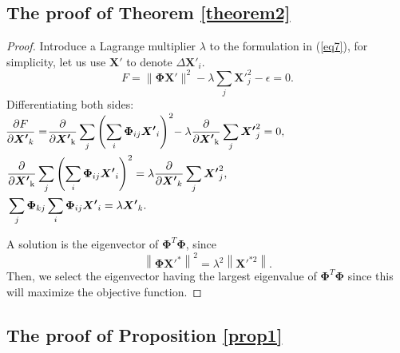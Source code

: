 \documentclass[conference,compsoc]{IEEEtran}
\begin{document}
\subsection{The proof of Theorem \ref{theorem2}}
\begin{proof}
\par Introduce a Lagrange multiplier $\lambda$ to the formulation in (\ref{eq7}), for simplicity, let us use $\boldsymbol{X'}$ to denote $\Delta \boldsymbol{X'}_i$.
\begin{equation*}
F=\|\boldsymbol{\Phi} \boldsymbol{X'}\|^2-\lambda \sum_j \boldsymbol{X'}_j^2-\epsilon=0. 
\end{equation*}
\noindent Differentiating both sides:\\
$
\begin{aligned}
&\mspace{-2mu} \frac{\partial F}{\partial \boldsymbol{X'}_k} = \mspace{-4mu} \frac{\partial}{\partial \boldsymbol{X'}_{\mathrm{k}}} \sum_j\left(\sum_i \boldsymbol{\Phi}_{i j} \boldsymbol{X'}_i\right)^2\mspace{-4mu} -\lambda \frac{\partial}{\partial \boldsymbol{X'}_{\mathrm{k}}} \sum_j \boldsymbol{X'}_j^2 = 0,
\\
&\frac{\partial}{\partial \boldsymbol{X'}_{\mathrm{k}}} \sum_j\left(\sum_i \boldsymbol{\Phi}_{i j} \boldsymbol{X'}_i\right)^2=\lambda \frac{\partial}{\partial \boldsymbol{X'}_k} \sum_j \boldsymbol{X'}_j^2, 
\\
& \sum_j \boldsymbol{\Phi}_{k j} \sum_i \boldsymbol{\Phi}_{i j} \boldsymbol{X'}_i=\lambda \boldsymbol{X'}_k. 
\end{aligned}
$
\par A solution is the eigenvector of $\boldsymbol{\Phi}^T \boldsymbol{\Phi}$, since 
\begin{equation*}
\left\|\boldsymbol{\Phi} \boldsymbol{X'}^*\right\|^2=\lambda^2\left\|\boldsymbol{X'}^{* 2}\right\|. 
\end{equation*}
\noindent Then, we select the eigenvector having the largest eigenvalue of $\boldsymbol{\Phi}^T \boldsymbol{\Phi}$ since this will maximize the objective function.
\end{proof}

\subsection{The proof of Proposition \ref{prop1}}
\end{document}
